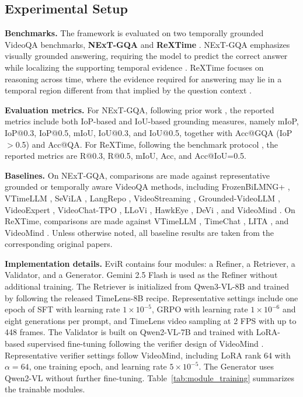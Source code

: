 \subsection{Experimental Setup}
\label{sec:exp_setup}

\textbf{Benchmarks.}
The framework is evaluated on two temporally grounded VideoQA benchmarks, \textbf{NExT-GQA} \cite{xiao2024can} and \textbf{ReXTime} \cite{chen2024rextime}. NExT-GQA emphasizes visually grounded answering, requiring the model to predict the correct answer while localizing the supporting temporal evidence \cite{xiao2024can}. ReXTime focuses on reasoning across time, where the evidence required for answering may lie in a temporal region different from that implied by the question context \cite{chen2024rextime}.

\textbf{Evaluation metrics.}
For NExT-GQA, following prior work \cite{xiao2024can,liu2025videomind}, the reported metrics include both IoP-based and IoU-based grounding measures, namely mIoP, IoP@0.3, IoP@0.5, mIoU, IoU@0.3, and IoU@0.5, together with Acc@GQA (IoP$>$0.5) and Acc@QA. For ReXTime, following the benchmark protocol \cite{chen2024rextime}, the reported metrics are R@0.3, R@0.5, mIoU, Acc, and Acc@IoU=0.5.

\textbf{Baselines.}
On NExT-GQA, comparisons are made against representative grounded or temporally aware VideoQA methods, including FrozenBiLMNG+ \cite{yang2022zero}, VTimeLLM \cite{huang2024vtimellm}, SeViLA \cite{yu2023sevila}, LangRepo \cite{kahatapitiya2025language}, VideoStreaming \cite{qian2024streaming}, Grounded-VideoLLM \cite{wang2025grounded_videollm}, VideoExpert \cite{zhao2025videoexpert}, VideoChat-TPO \cite{yan2025tpo}, LLoVi \cite{zhang2024simple}, HawkEye \cite{wang2024hawkeye}, DeVi \cite{qin2025question_answering_dense_video_events}, and VideoMind \cite{liu2025videomind}. On ReXTime, comparisons are made against VTimeLLM \cite{huang2024vtimellm}, TimeChat \cite{ren2024timechat}, LITA \cite{huang2024lita}, and VideoMind \cite{liu2025videomind}. Unless otherwise noted, all baseline results are taken from the corresponding original papers.

\textbf{Implementation details.}
EviR contains four modules: a Refiner, a Retriever, a Validator, and a Generator. Gemini 2.5 Flash is used as the Refiner without additional training. The Retriever is initialized from Qwen3-VL-8B and trained by following the released TimeLens-8B recipe. Representative settings include one epoch of SFT with learning rate $1\times10^{-5}$, GRPO with learning rate $1\times10^{-6}$ and eight generations per prompt, and TimeLens video sampling at 2 FPS with up to 448 frames. The Validator is built on Qwen2-VL-7B and trained with LoRA-based supervised fine-tuning following the verifier design of VideoMind \cite{liu2025videomind}. Representative verifier settings follow VideoMind, including LoRA rank 64 with $\alpha=64$, one training epoch, and learning rate $5\times10^{-5}$. The Generator uses Qwen2-VL \cite{wang2024qwen2} without further fine-tuning. Table~\ref{tab:module_training} summarizes the trainable modules.



